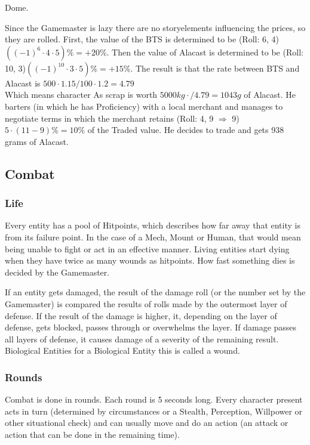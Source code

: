     Dome.\par
    Since the Gamemaster is lazy there are no storyelements influencing the prices, so they are rolled.
    First, the value of
    the BTS is determined to be (Roll: 6, 4) \(((-1)^{6}\cdot4\cdot5) \% = +20\%\).
    Then the value of Alacast is determined
    to be (Roll: 10, 3)\(((-1)^{10}\cdot3\cdot5) \% = +15\%\).
    The result is that the rate between BTS and Alacast is
    \( 500\cdot1.15/100\cdot1.2 = 4.79\) \\ Which means character As scrap is worth
    \(5000 kg\cdot / 4.79 = 1043 g \) of Alacast.
    He barters (in which he has Proficiency) with a local merchant and manages to
    negotiate terms in which the merchant retains (Roll: 4, 9 \(\Rightarrow\) 9) \(5\cdot(11-9)\% = 10\%\) of the Traded
    value.
    He decides to trade and gets 938 grams of Alacast.\vspace{1.5cm}
    \pagebreak[1]
    \subsection{Combat}\label{subsec:combat}
    \subsubsection{Life}
    Every entity has a pool of Hitpoints, which describes how far away that entity is from its failure point.
    In the case of a Mech, Mount or Human, that would mean being unable to fight or act in an effective manner.
    Living
    entities start dying when they have twice as many wounds as hitpoints.
    How fast something dies is decided by the
    Gamemaster.\par
    If an entity gets damaged, the result of the damage roll (or the number set by the Gamemaster) is compared the results
    of rolls made by the outermost layer of defense.
    If the result of the damage is higher, it, depending on the
    layer of defense, gets blocked, passes through or overwhelms the layer.
    If damage passes all layers of defense,
    it causes damage of a severity of the remaining result.
    Biological Entities for a Biological Entity this is called a wound.
    \subsubsection{Rounds}
    Combat is done in rounds.
    Each round is 5 seconds long.
    Every character present acts in turn (determined
    by circumstances or a Stealth, Perception, Willpower or other situational check) and can usually move and do an action
    (an attack or action that can be done in the remaining time).

